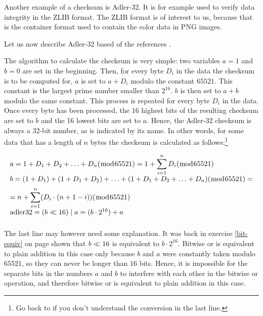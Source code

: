 \newcommand{\adlerchk}{Adler-32\xspace}

Another example of a checksum is \adlerchk. It is for example used to
verify data integrity in the ZLIB
format\cite{feldspar:_explan_deflat_algor}. The ZLIB format is of
interest to us, because that is the container format used to contain
the color data in PNG images.

Let us now describe \adlerchk based of the references
\cite{gailly96:_zlib_compr_data_format_specif,maxino:_revis_fletc_adler_check,DBLP:journals-tdsc-MaxinoK09_koopman}.

The algorithm to calculate the checksum is very simple: two variables
$a=1$ and $b=0$ are set in the beginning. Then, for every byte $D_i$
in the data the checksum is to be computed for, $a$ is set to $a +
D_i$ modulo the constant $65521$. This constant is the largest prime
number smaller than $2^{16}$. $b$ is then set to $a + b$ modulo the
same constant.  This process is repeated for every byte $D_i$ in the
data. Once every byte has been processed, the 16 highest bits of the
resulting checksum are set to $b$ and the 16 lowest bits are set to
$a$. Hence, the \adlerchk checksum is always a 32-bit number, as is
indicated by its name. In other words, for some data that has a length
of $n$ bytes the checksum is calculated as follows:\footnote{Go back
  to  if you don't understand the conversion
  in the last line. }

\begin{equation*}
  \def\between{2mm}
  \begin{array}{l}
    a = 1 + D_1 + D_2 + \ldots + D_n (\bmod{65521}) = 1 +
    \displaystyle\sum_{i = 1}^{n}D_i (\bmod{65521}) \\[\between]
    b = (1 + D_1) + (1 + D_1 + D_2) + \ldots + (1 + D_1 + D_2 + \ldots +
    D_n) (\bmod{65521}) = \\[\between]
    = n + \displaystyle\sum_{i = 1}^{n}(D_i \cdot (n + 1 - i)) (\bmod{65521})   \\[\between]
    \text{adler32} = (b \ShiftLeft 16) \BitOr a = (b \cdot 2^{16}) + a \\[\between]
  \end{array}
\end{equation*}

The last line may however need some explanation. It was back in
exercise \ref{bit-equiv} on page \pageref{bit-equiv} shown that $b
\ll 16$ is equivalent to $b \cdot 2^{16}$. Bitwise or is
equivalent to plain addition in this case only because $b$ and $a$
were constantly taken modulo $65521$, so they can never be longer than
$16$ bits. Hence, it is impossible for the separate bits in the
numbers $a$ and $b$ to interfere with each other in the bitwise or
operation, and therefore bitwise or is equivalent to plain addition in
this case.

